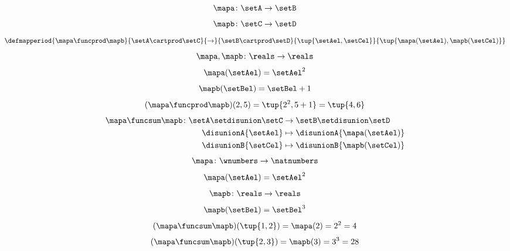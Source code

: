 \begin{forslides}
\begin{equation}\label{eq:slides_session2_169}
\mapa\colon \setA\to \setB
\end{equation}
\begin{equation}\label{eq:slides_session2_170}
\mapb\colon \setC\to \setD
\end{equation}
\begin{equation}\label{eq:slides_session2_171}
\defmapperiod{\mapa \funcprod \mapb}{\setA \cartprod \setC}{\to}{\setB\cartprod \setD}{\tup{\setAel, \setCel}}{\tup{\mapa(\setAel),\mapb(\setCel)}}
\end{equation}
\begin{equation}\label{eq:slides_session2_172}
\mapa,\mapb\colon \reals \to \reals
\end{equation}
\begin{equation}\label{eq:slides_session2_173}
\mapa(\setAel)=\setAel^2
\end{equation}
\begin{equation}\label{eq:slides_session2_174}
\mapb(\setBel)=\setBel+1
\end{equation}
\begin{equation}\label{eq:slides_session2_175}
(\mapa \funcprod \mapb)(2,5)=\tup{2^2,5+1}=\tup{4,6}
\end{equation}
\begin{equation}\label{eq:slides_session2_176}
\begin{aligned}
            \mapa \funcsum \mapb \colon \setA \setdisunion \setC & \to \setB\setdisunion \setD \\
            \disunionA{\setAel}                                  & \mapsto \disunionA{\mapa(\setAel)} \\
            \disunionB{\setCel}                                  & \mapsto \disunionB{\mapb(\setCel)} \\
        \end{aligned}
\end{equation}
\begin{equation}\label{eq:slides_session2_177}
\mapa\colon \wnumbers \to \natnumbers
\end{equation}
\begin{equation}\label{eq:slides_session2_178}
\mapa(\setAel)=\setAel^2
\end{equation}
\begin{equation}\label{eq:slides_session2_179}
\mapb\colon \reals \to \reals
\end{equation}
\begin{equation}\label{eq:slides_session2_180}
\mapb(\setBel)=\setBel^3
\end{equation}
\begin{equation}\label{eq:slides_session2_181}
(\mapa \funcsum \mapb)(\tup{1,2})=\mapa(2)=2^2=4
\end{equation}
\begin{equation}\label{eq:slides_session2_182}
(\mapa \funcsum \mapb)(\tup{2,3})=\mapb(3)=3^3 = 28
\end{equation}


\end{forslides}
